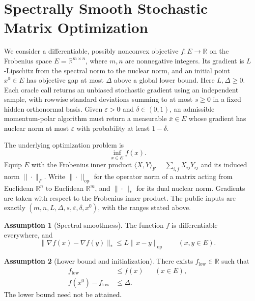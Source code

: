 \documentclass[10pt]{article}
\theoremstyle{definition}
\newtheorem{assumption}{Assumption}
\begin{document}
\section*{Spectrally Smooth Stochastic Matrix Optimization}
We consider a differentiable, possibly nonconvex objective $f:E\to\mathbb{R}$ on the Frobenius space $E=\mathbb{R}^{m\times n}$, where $m,n$ are nonnegative integers. Its gradient is $L$-Lipschitz from the spectral norm to the nuclear norm, and an initial point $x^0\in E$ has objective gap at most $\Delta$ above a global lower bound. Here $L,\Delta\geq0$. Each oracle call returns an unbiased stochastic gradient using an independent sample, with rowwise standard deviations summing to at most $s\geq0$ in a fixed hidden orthonormal basis. Given $\varepsilon>0$ and $\delta\in(0,1)$, an admissible momentum-polar algorithm must return a measurable $\bar{x}\in E$ whose gradient has nuclear norm at most $\varepsilon$ with probability at least $1-\delta$.

The underlying optimization problem is
\[
\inf_{x\in E} f(x).
\]
Equip $E$ with the Frobenius inner product $\langle X,Y\rangle_F=\sum_{i,j}X_{ij}Y_{ij}$ and its induced norm $\|\cdot\|_F$. Write $\|\cdot\|_{\mathrm{op}}$ for the operator norm of a matrix acting from Euclidean $\mathbb{R}^n$ to Euclidean $\mathbb{R}^m$, and $\|\cdot\|_*$ for its dual nuclear norm. Gradients are taken with respect to the Frobenius inner product. The public inputs are exactly $(m,n,L,\Delta,s,\varepsilon,\delta,x^0)$, with the ranges stated above.

\begin{assumption}[Spectral smoothness]
The function $f$ is differentiable everywhere, and
\[
\|\nabla f(x)-\nabla f(y)\|_*
\leq L\|x-y\|_{\mathrm{op}}
\qquad (x,y\in E).
\]
\end{assumption}

\begin{assumption}[Lower bound and initialization]
There exists $f_{\mathrm{low}}\in\mathbb{R}$ such that
\[
\begin{aligned}
f_{\mathrm{low}}&\leq f(x) &&(x\in E),\\
f(x^0)-f_{\mathrm{low}}&\leq\Delta.
\end{aligned}
\]
The lower bound need not be attained.
\end{assumption}
\end{document}
